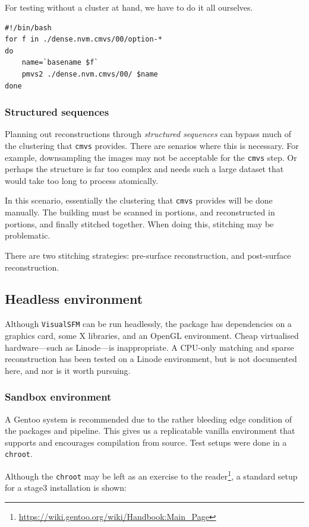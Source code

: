 For testing without a cluster at hand, we have to do it all ourselves.

\begin{lstlisting}
#!/bin/bash
for f in ./dense.nvm.cmvs/00/option-*
do
    name=`basename $f`
    pmvs2 ./dense.nvm.cmvs/00/ $name
done
\end{lstlisting}

\subsubsection{Structured sequences}

Planning out reconstructions through \emph{structured sequences} can bypass much of the clustering that {\tt cmvs} provides. There are senarios where this is necessary. For example, downsampling the images may not be acceptable for the {\tt cmvs} step. Or perhaps the structure is far too complex and needs such a large dataset that would take too long to process atomically.

In this scenario, essentially the clustering that {\tt cmvs} provides will be done manually. The building must be scanned in portions, and reconstructed in portions, and finally stitched together. When doing this, stitching may be problematic.

There are two stitching strategies: pre-surface reconstruction, and post-surface reconstruction.

\subsection{Headless environment}
Although {\tt VisualSFM} can be run headlessly, the package has dependencies on a graphics card, some X libraries, and an OpenGL environment. Cheap virtualised hardware---such as Linode---is inappropriate. A CPU-only matching and sparse reconstruction has been tested on a Linode environment, but is not documented here, and nor is it worth pursuing.
\subsubsection{Sandbox environment}
A Gentoo system is recommended due to the rather bleeding edge condition of the packages and pipeline. This gives us a replicatable vanilla environment that supports and encourages compilation from source. Test setups were done in a {\tt chroot}.

Although the {\tt chroot} may be left as an exercise to the reader\footnote{\url{https://wiki.gentoo.org/wiki/Handbook:Main\_Page}}, a standard setup for a stage3 installation is shown:

